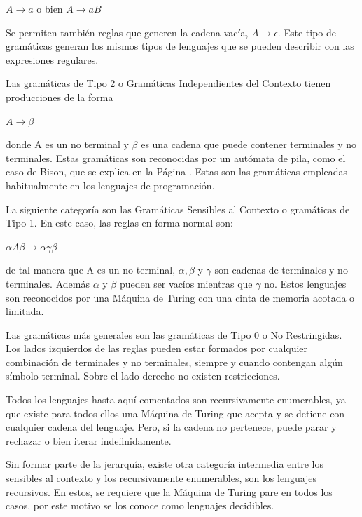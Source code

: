 \begin{center}
$A\rightarrow a$ o bien $A\rightarrow aB$
\end{center}

Se permiten también reglas que generen la cadena vacía, $A\rightarrow\epsilon$. Este tipo de gramáticas generan los mismos tipos de lenguajes que se pueden describir con las expresiones regulares.

Las gramáticas de Tipo 2 o Gramáticas Independientes del Contexto tienen producciones de la forma 

\begin{center}
$A\rightarrow \beta$
\end{center}

donde A es un no terminal y $\beta$ es una cadena que puede contener terminales y no terminales. Estas gramáticas son reconocidas por un autómata de pila, como el caso de Bison, que se explica en la Página \pageref{automatas-pila}. Estas son las gramáticas empleadas habitualmente en los lenguajes de programación.

La siguiente categoría son las Gramáticas Sensibles al Contexto o gramáticas de Tipo 1. En este caso, las reglas en forma normal son:

\begin{center}
$\alpha A\beta\rightarrow \alpha\gamma\beta$
\end{center}

de tal manera que A es un no terminal, $\alpha, \beta$ y $\gamma$ son cadenas de terminales y no terminales. Además $\alpha$ y $\beta$ pueden ser vacíos mientras que $\gamma$ no.
Estos lenguajes son reconocidos por una Máquina de Turing con una cinta de memoria acotada o limitada.

Las gramáticas más generales son las gramáticas de Tipo 0 o No Restringidas. Los lados izquierdos de las reglas pueden estar formados por cualquier combinación de terminales y no terminales, siempre y cuando contengan algún símbolo terminal. Sobre el lado derecho no existen restricciones.

Todos los lenguajes hasta aquí comentados son recursivamente enumerables, ya que existe para todos ellos una Máquina de Turing que acepta y se detiene con cualquier cadena del lenguaje. Pero, si la cadena no pertenece, puede parar y rechazar o bien iterar indefinidamente.

Sin formar parte de la jerarquía, existe otra categoría intermedia entre los sensibles al contexto y los recursivamente enumerables, son los lenguajes recursivos. En estos, se requiere que la Máquina de Turing pare en todos los casos, por este motivo se los conoce como lenguajes decidibles.

